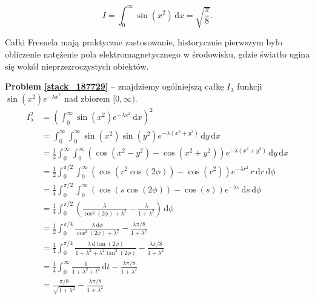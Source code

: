 %

\begin{problem}
    \label{stack_187729}%
    \begin{equation}
        I = \int_0^\infty \sin (x^2) \,\mathrm{d} x = \sqrt{\frac \pi 8}.
    \end{equation}
\end{problem}

Całki Fresnela mają praktyczne zastosowanie, historycznie pierwszym było obliczenie natężenie pola elektromagnetycznego w środowisku, gdzie światło ugina się wokół nieprzezroczystych obiektów.

\textbf{Problem \ref{stack_187729}} -- znajdziemy ogólniejszą całkę $I_\lambda$ funkcji $\sin(x^2) e^{-\lambda x^2}$ nad zbiorem $[0, \infty)$. %
\begin{align} %
    I_\lambda^2 & = \left(\int_0^\infty \sin(x^2) e^{-\lambda x^2} \,\mathrm{d}x \right)^2 \\ %
    & = \int_0^\infty \int_0^\infty \sin(x^2)\sin(y^2) e^{- \lambda(x^2+y^2)}\,\mathrm{d}y\,\mathrm{d}x \\ %
    & = \frac12 \int_0^\infty \int_0^\infty \left(\cos(x^2-y^2)-\cos(x^2+y^2)\right) e^{- \lambda(x^2+y^2)}\,\mathrm{d}y\,\mathrm{d}x \\ %
    & = \frac12 \int_0^{\pi/2} \int_0^\infty \left(\cos(r^2\cos(2\phi))-\cos(r^2)\right)e^{- \lambda r^2} \,r\,\mathrm{d}r\,\mathrm{d}\phi \\ %
    & = \frac14 \int_0^{\pi/2} \int_0^\infty \left(\cos(s\cos(2\phi))-\cos(s)\right) e^{- \lambda s} \,\mathrm{d}s\,\mathrm{d}\phi \\ %
    & = \frac14 \int_0^{\pi/2} \left( \frac{ \lambda}{\cos^2(2\phi)+ \lambda^2} - \frac{ \lambda}{1+ \lambda^2}\right)\,\mathrm{d}\phi \\ %
    & = \frac12 \int_0^{\pi/4} \frac{ \lambda\,\mathrm{d}\phi}{\cos^2(2\phi)+ \lambda^2} - \frac{ \lambda\pi/8}{1+ \lambda^2} \\ %
    & = \frac14 \int_0^{\pi/4} \frac{ \lambda\,\mathrm{d} \tan(2\phi)} {1+ \lambda^2+ \lambda^2 \tan^2(2\phi)} - \frac{ \lambda\pi/8}{1+ \lambda^2} \\ %
    & = \frac14 \int_0^\infty \frac1{1+ \lambda^2+t^2}\,\mathrm{d}t - \frac{ \lambda\pi/8}{1+ \lambda^2} \\ %
    & = \frac{\pi/8}{\sqrt{1+ \lambda^2}} - \frac{ \lambda\pi/8}{1+ \lambda^2} %
\end{align} %

%